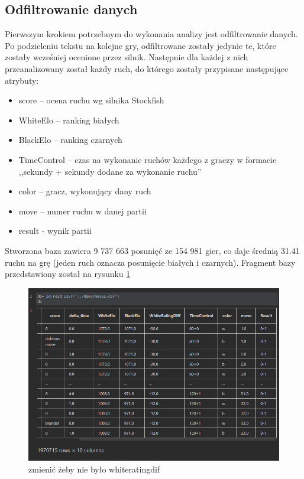\documentclass[inzynierska]{pwr_wmat_praca_dyplomowa}
\theoremstyle{plain}
\numberwithin{theorem}{chapter}
\theoremstyle{definition}
\numberwithin{theorem}{chapter}
\begin{document}
\subsection{Odfiltrowanie danych}

Pierwszym krokiem potrzebnym do wykonania analizy jest odfiltrowanie danych.
Po podzieleniu tekstu na kolejne gry, odfiltrowane zostały jedynie te, które zostały wcześniej ocenione przez silnik. Następnie dla każdej z nich przeanalizowany został każdy ruch, do którego zostały przypisane następujące atrybuty:
\begin{itemize}
	\item score -- ocena ruchu wg silnika Stockfish
	\item WhiteElo -- ranking białych
	\item BlackElo -- ranking czarnych
	\item TimeControl -- czas na wykonanie ruchów każdego z graczy w formacie  ,,sekundy + sekundy dodane za wykonanie ruchu''
	\item color -- gracz, wykonujący dany ruch
	\item move -- numer ruchu w danej partii
	\item result - wynik partii
\end{itemize}

Stworzona baza zawiera 9 737 663 posunięć ze 154 981 gier, co daje średnią 31.41 ruchu na grę (jeden ruch oznacza posunięcie białych i czarnych). Fragment bazy przedstawiony został na rysunku \ref{rys:baza_ruchow}
\begin{figure}[H]
	\centering
	\includegraphics[width=\textwidth]{danee.png}
	\caption{zmienić żeby nie było whiteratingdif}
	\label{rys:baza_ruchow}
\end{figure}
\end{document}

